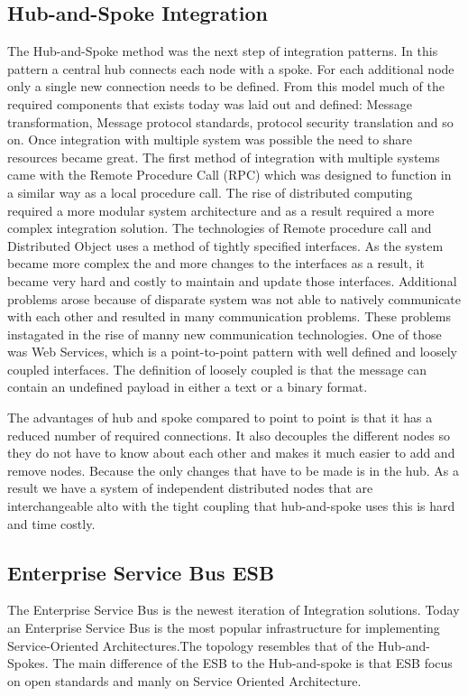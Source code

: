 \documentclass{llncs}
\begin{document}
\subsection{Hub-and-Spoke Integration}
The Hub-and-Spoke\cite{risimic06,hasptp} method was the next step of integration patterns. In this pattern a central hub connects each node with a spoke. For each additional node only a single new connection needs to be defined. From this model much of the required components that exists today was laid out and defined: Message transformation, Message protocol standards, protocol security translation and so on. Once integration with multiple system was possible the need to share resources became great. The first method of integration with multiple systems came with the Remote Procedure Call (RPC) which was designed to function in a similar way as a local procedure call. The rise of distributed computing required a more modular system architecture and as a result required a more complex integration solution. The technologies of Remote procedure call and Distributed Object uses a method of tightly specified interfaces. As the system became more complex the and more changes to the interfaces as a result, it became very hard and costly to maintain and update those interfaces. Additional problems arose because of disparate system was not able to natively communicate with each other and resulted in many communication problems. These problems instagated in the rise of manny new communication technologies. One of those was Web Services, which is a point-to-point pattern with well defined and loosely coupled interfaces. The definition of loosely coupled is that the message can contain an undefined payload in either a text or a binary format.

The advantages of hub and spoke compared to point to point is that it has a reduced number of required connections. It also decouples the different nodes so they do not have to know about each other and makes it much easier to add and remove nodes. Because the only changes that have to be made is in the hub. As a result we have a system of independent distributed nodes that are interchangeable alto with the tight coupling that hub-and-spoke uses this is hard and time costly.

\subsection{Enterprise Service Bus ESB}
The Enterprise Service Bus is the newest iteration of Integration solutions. Today an Enterprise Service Bus is the most popular infrastructure for implementing Service-Oriented Architectures\cite{esb}.The topology resembles that of the Hub-and-Spokes. The main difference of the ESB to the Hub-and-spoke is that ESB focus on open standards and manly on Service Oriented Architecture.
\end{document}

